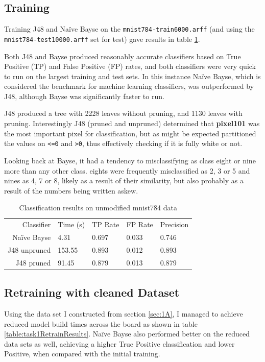 \documentclass[10pt]{article}
\begin{document}
    \subsection{Training}
      Training J48 and Naïve Bayse on the \texttt{mnist784-train6000.arff} (and using the \texttt{mnist784-test10000.arff} set for test) gave results in table \ref{table:task1initialTrainResults}.

      Both J48 and Bayse produced reasonably accurate classifiers based on True Positive (TP) and False Positive (FP) rates, and both classifiers were very quick to run on the largest training and test sets. In this instance Naïve Bayse, which is considered the benchmark for machine learning classifiers, was outperformed by J48, although Bayse was significantly faster to run. 

      J48 produced a tree with 2228 leaves without pruning, and 1130 leaves with pruning. Interestingly J48 (pruned and unpruned) determined that \textbf{pixel101} was the most important pixel for classification, but as might be expected partitioned the values on \texttt{\textless=0} and \texttt{\textgreater0}, thus effectively checking if it is fully white or not.

      Looking back at Bayse, it had a tendency to misclassifying as class eight or nine more than any other class. eights were frequently misclassified as 2, 3 or 5 and nines as 4, 7 or 8, likely as a result of their similarity, but also probably as a result of the numbers being written askew.

      \begin{table}
        \centering
        \begin{tabular}{ | r | l | l | l | l | }
          \hline
          Classifier   & Time (s) & TP Rate & FP Rate & Precision \\ \hhline{|=|=|=|=|=|}
          Naïve Bayse  & 4.31     & 0.697   & 0.033   & 0.746     \\ \hline
          J48 unpruned & 153.55   & 0.893   & 0.012   & 0.893     \\ \hline
          J48 pruned   & 91.45    & 0.879   & 0.013   & 0.879     \\ \hline
        \end{tabular}
        \caption{Classification results on unmodified mnist784 data}
        \label{table:task1initialTrainResults}
      \end{table}

    \subsection{Retraining with cleaned Dataset}
      Using the data set I constructed from section \ref{sec:1A}, I managed to achieve reduced model build times across the board as shown in table \ref{table:task1RetrainResults}. Naïve Bayse also performed better on the reduced data sets as well, achieving a higher True Positive classification and lower Positive, when compared with the initial training.
\end{document}
